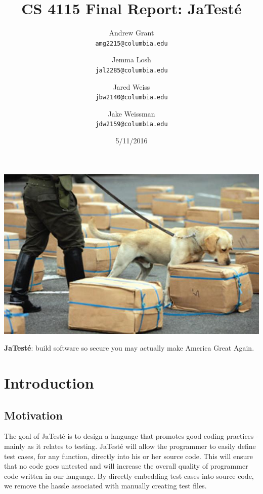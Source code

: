\documentclass{article}
\title{CS 4115 Final Report: \textbf{JaTest\'{e}}}
\author{
	Andrew Grant\\
	\texttt{amg2215@columbia.edu}
	\and
	Jemma Losh\\
	\texttt{jal2285@columbia.edu}
	\and
	Jared Weiss\\
	\texttt{jbw2140@columbia.edu}
	\and
	Jake Weissman\\
	\texttt{jdw2159@columbia.edu}
}
\date{5/11/2016}
\begin{document}
\maketitle
\includegraphics[width=\textwidth]{search_dog.jpg}

\begin{center}
{\huge \textbf{JaTest\'{e}}: build software so secure you may actually make America Great Again.}
\end{center}
\newpage


\tableofcontents
\newpage

\section{Introduction}

\subsection{Motivation}
The goal of JaTest\'{e} is to design a language that promotes good coding practices - mainly as it relates to testing.  JaTest\'{e} will allow the programmer to easily define test cases, for any function, directly into his or her source code. This will ensure that no code goes untested and will increase the overall quality of programmer code written in our language. By directly embedding test cases into source code, we remove the hassle associated with manually creating test files.
\end{document}
